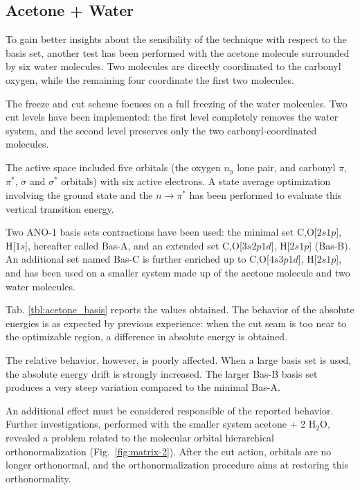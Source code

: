 \newpage
\subsection{Acetone + Water}

To gain better insights about the sensibility of the technique with respect
to the basis set, another test has been performed with the acetone molecule
surrounded by six water molecules. Two molecules are directly coordinated to
the carbonyl oxygen, while the remaining four coordinate the first
two molecules.


\vspace{-5mm}
The freeze and cut scheme focuses on a full freezing of the water molecules.
Two cut levels have been implemented: the first level completely removes the
water system, and the second level preserves only the two carbonyl-coordinated molecules.

The active space included five orbitals (the oxygen $n_y$ lone pair, and
carbonyl $\pi$, $\pi^{*}$, $\sigma$ and $\sigma^{*}$ orbitals) with six
active electrons. A state average optimization involving the ground state
and the $n \rightarrow \pi^{*}$ has been performed to evaluate this vertical
transition energy.

Two ANO-1 basis sets contractions have been used: the minimal set
C,O[$2s1p$], H[$1s$], hereafter called Bas-A, and an extended set
C,O[$3s2p1d$], H[$2s1p$] (Bas-B). An additional set named Bas-C is further
enriched up to C,O[$4s3p1d$], H[$2s1p$], and has been used on a smaller
system made up of the acetone molecule and two water molecules.


Tab. \ref{tbl:acetone_basis} reports the values obtained. 
The behavior of the absolute energies is as expected by previous experience:
when the cut seam is too near to the optimizable region, a difference in
absolute energy is obtained. 

The relative behavior, however, is poorly
affected.  When a large basis set is used, the absolute energy drift is
strongly increased. The larger Bas-B basis set produces a very steep
variation compared to the minimal Bas-A. 



An additional effect must be considered responsible of the reported
behavior.  Further investigations, performed with the smaller system acetone
+ 2 H$_2$O, revealed a problem related to the molecular orbital hierarchical
orthonormalization (Fig.~\ref{fig:matrix-2}). After the cut action,
orbitals are no longer orthonormal, and the orthonormalization procedure
aims at restoring this orthonormality. 

